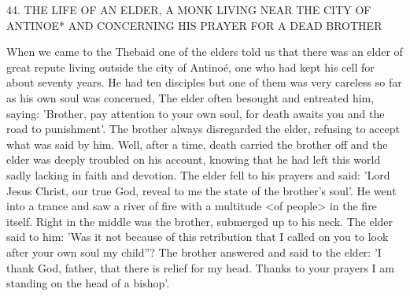 44. THE LIFE OF AN ELDER,
A MONK LIVING NEAR THE CITY OF ANTINOE*
AND CONCERNING HIS PRAYER
FOR A DEAD BROTHER

When we came to the Thebaid one of the elders told us that there
was an elder of great repute living outside the city of Antinoé, one
who had kept his cell for about seventy years. He had ten disciples
but one of them was very careless so far as his own soul was
concerned, The elder often besought and entreated him, saying:
'Brother, pay attention to your own soul, for death awaits you and
the road to punishment'. The brother always disregarded the elder,
refusing to accept what was said by him. Well, after a time, death
carried the brother off and the elder was deeply troubled on his
account, knowing that he had left this world sadly lacking in faith
and devotion. The elder fell to his prayers and said: 'Lord Jesus
Christ, our true God, reveal to me the state of the brother's soul'.
He went into a trance and saw a river of fire with a multitude <of
people> in the fire itself. Right in the middle was the brother,
submerged up to his neck. The elder said to him: 'Was it not
because of this retribution that I called on you to look after your
own soul my child”? The brother answered and said to the elder: 'I
thank God, father, that there is relief for my head. Thanks to your
prayers I am standing on the head of a bishop'.

